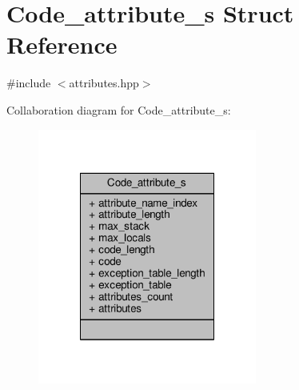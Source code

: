\hypertarget{structCode__attribute__s}{\section{Code\+\_\+attribute\+\_\+s Struct Reference}
\label{structCode__attribute__s}
}


{\ttfamily \#include $<$attributes.\+hpp$>$}



Collaboration diagram for Code\+\_\+attribute\+\_\+s\+:\nopagebreak
\begin{figure}[H]
\begin{center}
\leavevmode
\includegraphics[width=204pt]{structCode__attribute__s__coll__graph}
\end{center}
\end{figure}
